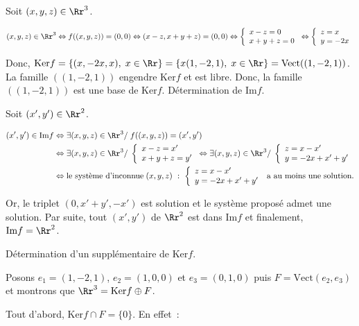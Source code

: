 {\begin{enumerate}
{Soit $(x,y,z)\in\Rr^3$.

\begin{align*}
(x,y,z)\in\Rr^3\Leftrightarrow f((x,y,z))=(0,0)\Leftrightarrow(x-z,x+y+z)=(0,0)\Leftrightarrow
\left\{
\begin{array}{l}
x-z=0\\
x+y+z=0
\end{array}
\right.\Leftrightarrow
\left\{
\begin{array}{l}
z=x\\
y=-2x
\end{array}
\right.
\end{align*}

Donc, $\mbox{Ker}f=\{(x,-2x,x),\;x\in\Rr\}=\{x(1,-2,1),\;x\in\Rr\}=\mbox{Vect}((1,-2,1))$.
La famille $((1,-2,1))$ engendre $\mbox{Ker}f$ et est libre. Donc, la famille $((1,-2,1))$ est une base de
$\mbox{Ker}f$.
Détermination de $\mbox{Im}f$.

Soit $(x',y')\in\Rr^2$.

\begin{align*}
(x',y')\in\mbox{Im}f&\Leftrightarrow\exists(x,y,z)\in\Rr^3/\;f((x,y,z))=(x',y')\\
 &\Leftrightarrow\exists(x,y,z)\in\Rr^3/\;
\left\{
\begin{array}{l}
x-z=x'\\
x+y+z=y'
\end{array}
\right.
\Leftrightarrow\exists(x,y,z)\in\Rr^3/\;
\left\{
\begin{array}{l}
z=x-x'\\
y=-2x+x'+y'
\end{array}
\right.\\
 &\Leftrightarrow\mbox{le système d'inconnue}\;(x,y,z)~:~\left\{
\begin{array}{l}
z=x-x'\\
y=-2x+x'+y'
\end{array}
\right.
\;\mbox{a au moins une solution.}
\end{align*}

Or, le triplet $(0,x'+y',-x')$ est solution et le système proposé admet une solution. Par suite, tout $(x',y')$ de
$\Rr^2$ est dans $\mbox{Im}f$ et finalement, $\mbox{Im}f=\Rr^2$.

Détermination d'un supplémentaire de $\mbox{Ker}f$.

Posons $e_1=(1,-2,1)$, $e_2=(1,0,0)$ et $e_3=(0,1,0)$ puis $F=\mbox{Vect}(e_2,e_3)$ et montrons que
$\Rr^3=\mbox{Ker}f\oplus F$.

Tout d'abord, $\mbox{Ker}f\cap F=\{0\}$. En effet~:

}
\end{enumerate}}
